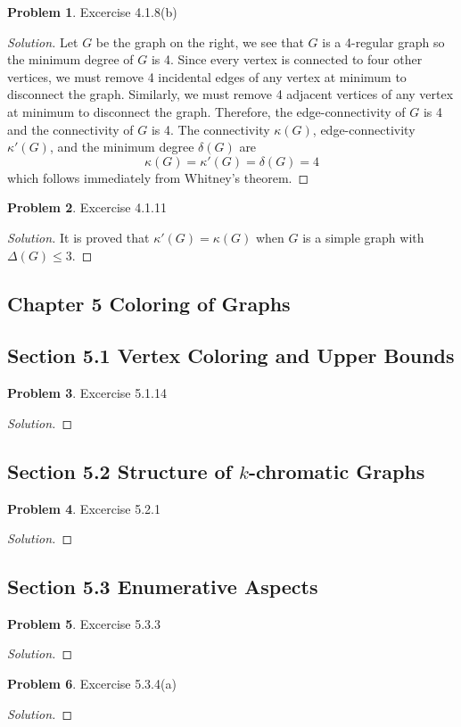 \documentclass[12pt]{article}
\theoremstyle{definition}
\newtheorem{problem}{Problem}
\newenvironment*{solution}{\begin{proof}[Solution]}{\end{proof}}
\begin{document}
\begin{problem}
    Excercise 4.1.8(b)
\end{problem}
\begin{solution}
    Let \(G\) be the graph on the right, we see that \(G\) is a 4-regular graph so the minimum degree of \(G\) is 4.
    Since every vertex is connected to four other vertices,
    we must remove 4 incidental edges of any vertex at minimum to disconnect the graph.
    Similarly, we must remove 4 adjacent vertices of any vertex at minimum to disconnect the graph.
    Therefore, the edge-connectivity of \(G\) is 4 and the connectivity of \(G\) is 4.
    The connectivity \(\kappa(G)\), edge-connectivity \(\kappa'(G)\), and the minimum degree \(\delta(G)\) are
    \[\kappa(G) = \kappa'(G) = \delta(G) = 4\] which follows immediately from Whitney's theorem.
\end{solution}

\begin{problem}
    Excercise 4.1.11
\end{problem}
\begin{solution}
    It is proved that \(\kappa'(G)=\kappa(G)\) when \(G\) is a simple graph with \(\Delta(G)\leq3\).
\end{solution}

\subsection*{Chapter 5 Coloring of Graphs}
\subsection*{Section 5.1 Vertex Coloring and Upper Bounds}
\begin{problem}
    Excercise 5.1.14
\end{problem}
\begin{solution}
    
\end{solution}

\subsection*{Section 5.2 Structure of \(k\)-chromatic Graphs}
\begin{problem}
    Excercise 5.2.1
\end{problem}
\begin{solution}
    
\end{solution}

\subsection*{Section 5.3 Enumerative Aspects}
\begin{problem}
    Excercise 5.3.3
\end{problem}
\begin{solution}
    
\end{solution}
\begin{problem}
    Excercise 5.3.4(a)
\end{problem}
\begin{solution}
    
\end{solution}
\end{document}
